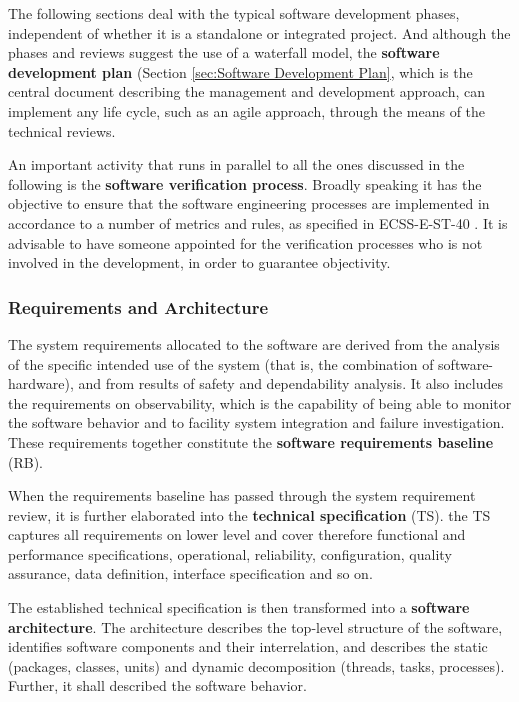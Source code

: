 The following sections deal with the typical software development phases, independent of whether it is a standalone or integrated project. And although the phases and reviews suggest the use of a waterfall model, the \textbf{software development plan} (Section \ref{sec:Software Development Plan}, which is the central document describing the management and development approach, can implement any life cycle, such as an agile approach, through the means of the technical reviews.

An important activity that runs in parallel to all the ones discussed in the following is the \textbf{software verification process}. Broadly speaking it has the objective to ensure that the software engineering processes are implemented in accordance to a number of metrics and rules, as specified in ECSS-E-ST-40 \cite{ECSS-E-ST-40}. It is advisable to have someone appointed for the verification processes who is not involved in the development, in order to guarantee objectivity.

\subsubsection{Requirements and Architecture}

The system requirements allocated to the software are derived from the analysis of the specific intended use of the system (that is, the combination of software-hardware), and from results of safety and dependability analysis. It also includes the requirements on observability, which is the capability of being able to monitor the software behavior and to facility system integration and failure investigation. These requirements together constitute the \textbf{software requirements baseline} (RB).

When the requirements baseline has passed through the system requirement review, it is further elaborated into the \textbf{technical specification} (TS). the TS captures all requirements on lower level and cover therefore functional and performance specifications, operational, reliability, configuration, quality assurance, data definition, interface specification and so on.

The established technical specification is then transformed into a \textbf{software architecture}. The architecture describes the top-level structure of the software, identifies software components and their interrelation, and describes the static (packages, classes, units) and dynamic decomposition (threads, tasks, processes). Further, it shall described the software behavior.

